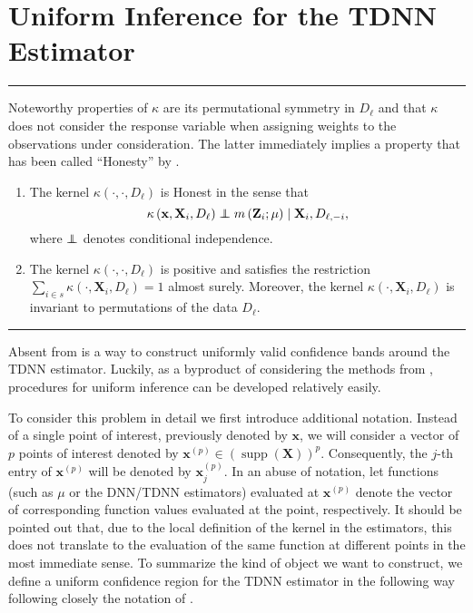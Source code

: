 \section{Uniform Inference for the TDNN Estimator}\label{sec:unif_inf}
\hrule

Noteworthy properties of $\kappa$ are its permutational symmetry in $D_{\ell}$ and that $\kappa$ does not consider the response variable when assigning weights to the observations under consideration.
The latter immediately implies a property that has been called ``Honesty'' by \citet{wager_estimation_2018}.

\begin{boxD}
	\begin{dfn}\label{Symmetry_Honesty}\mbox{}
		\begin{enumerate}
			\item The kernel $\kappa\left(\cdot, \cdot, D_{\ell}\right)$ is Honest in the sense that
				  $$\kappa\left(\mathbf{x}, \mathbf{X}_i, D_{\ell}\right) \perp\!\!\!\!\perp m\left(\mathbf{Z}_i ; \mu\right) \mid \mathbf{X}_i, D_{\ell,-i},$$
				  where $\perp\!\!\!\!\perp$ denotes conditional independence.
			\item The kernel $\kappa\left(\cdot, \cdot, D_{\ell}\right)$ is positive and satisfies the restriction
				  $\sum_{i \in s} \kappa\left(\cdot, \mathbf{X}_i, D_{\ell}\right)=1$ almost surely.
				  Moreover, the kernel $\kappa\left(\cdot, \mathbf{X}_i, D_{\ell}\right)$ is invariant to permutations of the data $D_{\ell}.$
		\end{enumerate}
	\end{dfn}
\end{boxD}

\hrule
Absent from \citet{demirkaya_optimal_2024} is a way to construct uniformly valid confidence bands around the TDNN estimator.
Luckily, as a byproduct of considering the methods from \citet{ritzwoller_uniform_2024}, procedures for uniform inference can be developed relatively easily.

To consider this problem in detail we first introduce additional notation.
Instead of a single point of interest, previously denoted by $\mathbf{x}$, we will consider a vector of $p$ points of interest denoted by $\mathbf{x}^{(p)} \in \left(\operatorname{supp}\left(\mathbf{X}\right)\right)^{p}$.
Consequently, the $j$-th entry of $\mathbf{x}^{(p)}$ will be denoted by $\mathbf{x}^{(p)}_{j}$.
In an abuse of notation, let functions (such as $\mu$ or the DNN/TDNN estimators) evaluated at $\mathbf{x}^{(p)}$ denote the vector of corresponding function values evaluated at the point, respectively.
It should be pointed out that, due to the local definition of the kernel in the estimators, this does not translate to the evaluation of the same function at different points in the most immediate sense.
To summarize the kind of object we want to construct, we define a uniform confidence region for the TDNN estimator in the following way following closely the notation of \citet{ritzwoller_uniform_2024}.

